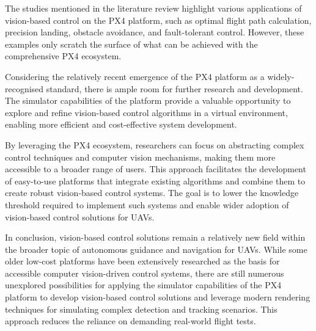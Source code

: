 The studies mentioned in the literature review highlight various applications of vision-based control on the PX4 platform, such as optimal flight path calculation, precision landing, obstacle avoidance, and fault-tolerant control. However, these examples only scratch the surface of what can be achieved with the comprehensive PX4 ecosystem.

Considering the relatively recent emergence of the PX4 platform as a widely-recognised standard, there is ample room for further research and development. The simulator capabilities of the platform provide a valuable opportunity to explore and refine vision-based control algorithms in a virtual environment, enabling more efficient and cost-effective system development.

By leveraging the PX4 ecosystem, researchers can focus on abstracting complex control techniques and computer vision mechanisms, making them more accessible to a broader range of users. This approach facilitates the development of easy-to-use platforms that integrate existing algorithms and combine them to create robust vision-based control systems. The goal is to lower the knowledge threshold required to implement such systems and enable wider adoption of vision-based control solutions for UAVs.


In conclusion, vision-based control solutions remain a relatively new field within the broader topic of autonomous guidance and navigation for UAVs. While some older low-cost platforms have been extensively researched as the basis for accessible computer vision-driven control systems, there are still numerous unexplored possibilities for applying the simulator capabilities of the PX4 platform to develop vision-based control solutions and leverage modern rendering techniques for simulating complex detection and tracking scenarios. This approach reduces the reliance on demanding real-world flight tests.
